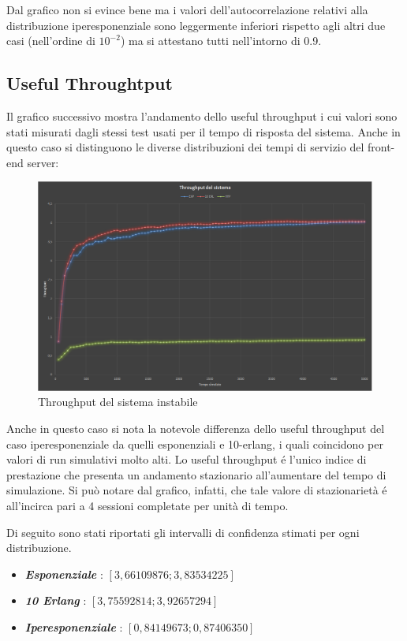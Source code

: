 Dal grafico non si evince bene ma i valori dell'autocorrelazione relativi alla distribuzione
iperesponenziale sono leggermente inferiori rispetto agli altri due casi (nell'ordine di $10^{-2}$)
ma si attestano tutti nell'intorno di 0.9.

\subsection{Useful Throughtput}

Il grafico successivo mostra l’andamento dello useful throughput i cui valori sono stati
misurati dagli stessi test usati per il tempo di risposta del sistema. Anche in questo caso si 
distinguono le diverse distribuzioni dei tempi di servizio del front-end server:

\begin{figure}[H]
 \centering
 \includegraphics[scale=0.45]{img/throughput.png}
 \caption[Throughput del sistema instabile]{Throughput del sistema instabile}
 \label{fig:Throughput del sistema instabile}
\end{figure}

Anche in questo caso si nota la notevole differenza dello useful throughput  del caso 
iperesponenziale da quelli esponenziali e 10-erlang, i quali coincidono per valori di run  
simulativi molto alti.
Lo useful throughput \'e l’unico indice di prestazione che presenta un andamento stazionario 
all’aumentare del tempo di simulazione. Si pu\`o notare dal grafico, infatti, che tale valore di 
stazionariet\`a \'e all’incirca pari a 4 sessioni completate per unit\`a di tempo.


Di seguito sono stati riportati gli intervalli di confidenza stimati per ogni distribuzione. 
\begin{itemize}
 \item \textit{\textbf{Esponenziale}} : $[ 3,66109876 ; 3,83534225 ]$
 \item \textit{\textbf{10 Erlang}} : $[ 3,75592814 ; 3,92657294 ]$
 \item \textit{\textbf{Iperesponenziale}} : $[ 0,84149673 ; 0,87406350 ]$
\end{itemize}

